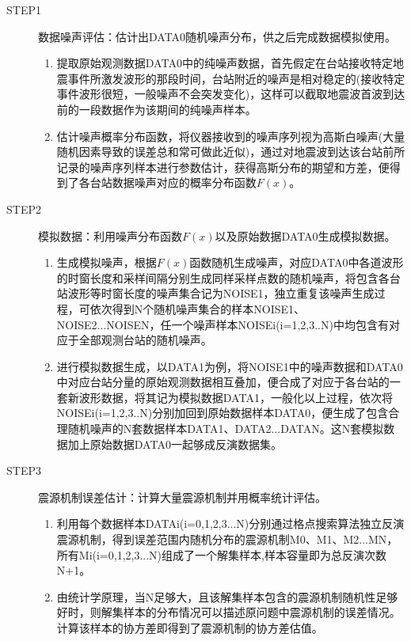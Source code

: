 \begin{description}
\item[STEP1]数据噪声评估：估计出DATA0随机噪声分布，供之后完成数据模拟使用。
\begin{enumerate}
\item 提取原始观测数据DATA0中的纯噪声数据，首先假定在台站接收特定地震事件所激发波形的那段时间，台站附近的噪声是相对稳定的(接收特定事件波形很短，一般噪声不会突发变化)，这样可以截取地震波首波到达前的一段数据作为该期间的纯噪声样本。
\item 估计噪声概率分布函数，将仪器接收到的噪声序列视为高斯白噪声(大量随机因素导致的误差总和常可做此近似)，通过对地震波到达该台站前所记录的噪声序列样本进行参数估计，获得高斯分布的期望和方差，便得到了各台站数据噪声对应的概率分布函数$F(x)$。
\end{enumerate}

\item[STEP2]模拟数据：利用噪声分布函数$F(x)$以及原始数据DATA0生成模拟数据。
\begin{enumerate}
\item 生成模拟噪声，根据$F(x)$函数随机生成噪声，对应DATA0中各道波形的时窗长度和采样间隔分别生成同样采样点数的随机噪声，将包含各台站波形等时窗长度的噪声集合记为NOISE1，独立重复该噪声生成过程，可依次得到N个随机噪声集合的样本NOISE1、NOISE2...NOISEN，任一个噪声样本NOISEi(i=1,2,3..N)中均包含有对应于全部观测台站的随机噪声。
\item 进行模拟数据生成，以DATA1为例，将NOISE1中的噪声数据和DATA0中对应台站分量的原始观测数据相互叠加，便合成了对应于各台站的一套新波形数据，将其记为模拟数据DATA1，一般化以上过程，依次将NOISEi(i=1,2,3..N)分别加回到原始数据样本DATA0，便生成了包含合理随机噪声的N套数据样本DATA1、DATA2...DATAN。这N套模拟数据加上原始数据DATA0一起够成反演数据集。
\end{enumerate}

\item[STEP3]震源机制误差估计：计算大量震源机制并用概率统计评估。
\begin{enumerate}
\item 利用每个数据样本DATAi(i=0,1,2,3...N)分别通过格点搜索算法独立反演震源机制，得到误差范围内随机分布的震源机制M0、M1、M2...MN，所有Mi(i=0,1,2,3...N)组成了一个解集样本,样本容量即为总反演次数N+1。
\item 由统计学原理，当N足够大，且该解集样本包含的震源机制随机性足够好时，则解集样本的分布情况可以描述原问题中震源机制的误差情况。计算该样本的协方差即得到了震源机制的协方差估值。
\end{enumerate}

\end{description}
